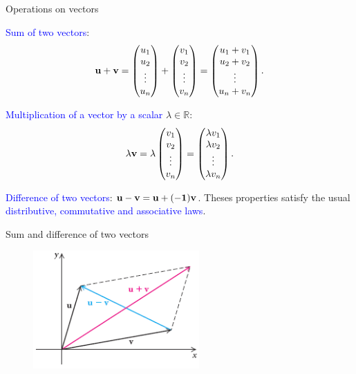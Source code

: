 \documentclass[11pt,aspectratio=169]{beamer}
\begin{document}
\begin{frame}{Operations on vectors}

\textcolor{blue}{Sum of two vectors}:
\begin{equation*}
\bf{u}+\bf{v}=\begin{pmatrix}u_1\\
u_2 \\
\vdots\\
u_n
\end{pmatrix}+
\begin{pmatrix}v_1\\
v_2 \\
\vdots\\
v_n
\end{pmatrix}=\begin{pmatrix}u_1+v_1\\
u_2+v_2 \\
\vdots\\
u_n+v_n
\end{pmatrix}.
\end{equation*}

\textcolor{blue}{Multiplication of a vector by a scalar} $\lambda \in \mathbb{R}$:
\begin{equation*}
\lambda \bf{v}=\lambda\begin{pmatrix}v_1\\
v_2 \\
\vdots\\
v_n
\end{pmatrix}=
\begin{pmatrix} \lambda v_1\\
\lambda v_2 \\
\vdots\\
\lambda v_n
\end{pmatrix}.
\end{equation*}

\textcolor{blue}{Difference of two vectors}: $\bf{u}-\bf{v}=\bf{u}+(-1)\bf{v}$.
\vskip 10pt
Theses properties satisfy the usual \textcolor{blue}{distributive, commutative and associative laws}.
\end{frame}

\begin{frame}{Sum and difference of two vectors}

\begin{figure}
\includegraphics[width=2.5in]{img/sum} 
\end{figure}\end{frame}
\end{document}
